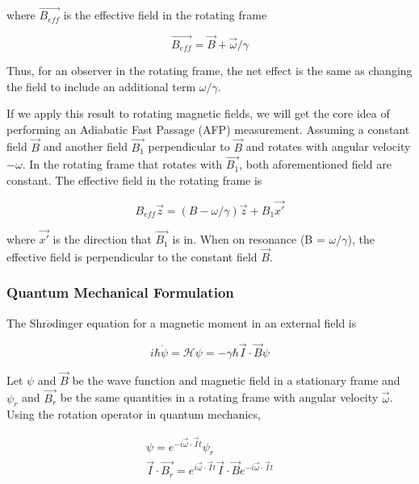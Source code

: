 where $\vec{B_{eff}}$ is the effective field in the rotating frame

\begin{equation}
\vec{B_{eff}}=\vec{B} + \vec{\omega}/\gamma
\end{equation}

Thus, for an observer in the rotating frame, the net effect is the same as changing the field to include an additional term $\omega/\gamma$.

If we apply this result to rotating magnetic fields, we will get the core idea of performing an Adiabatic Fast Passage (AFP) measurement. Assuming a constant field $\vec{B}$ and another field $\vec{B_{1}}$ perpendicular to $\vec{B}$ and rotates with angular velocity $-\omega$. In the rotating frame that rotates with $\vec{B_{1}}$, both aforementioned field are constant. The effective field in the rotating frame is

\begin{equation}\label{EffectiveField}
B_{eff}\vec{z}=(B-\omega/\gamma)\vec{z} + B_{1}\vec{x'}
\end{equation}

where $\vec{x'}$ is the direction that $\vec{B_{1}}$ is in. When on resonance (B = $\omega/\gamma$), the effective field is perpendicular to the constant field $\vec{B}$.

\subsubsection{Quantum Mechanical Formulation}

The Shr$\ddot{o}$dinger equation for a magnetic moment in an external field is

\begin{equation}\label{eq3}
i\hbar \dot{\psi}=\mathcal{H} \psi=-\gamma \hbar \vec{I}\cdot \vec{B} \psi
\end{equation}

Let $\psi$ and $\vec{B}$ be the wave function and magnetic field in a stationary frame and $\psi_{r}$ and $\vec{B_{r}}$ be the same quantities in a rotating frame with angular velocity $\vec{\omega}$. Using the rotation operator in quantum mechanics, 

\begin{subequations}\label{eq4}
	\begin{gather}
	\psi=e^{-i\vec{\omega}\cdot \vec{I}t}\psi_{r} \\
	\vec{I}\cdot \vec{B_{r}} = e^{i\vec{\omega}\cdot \vec{I}t}\vec{I}\cdot \vec{B} e^{-i\vec{\omega}\cdot \vec{I}t}
	\end{gather}
\end{subequations}

